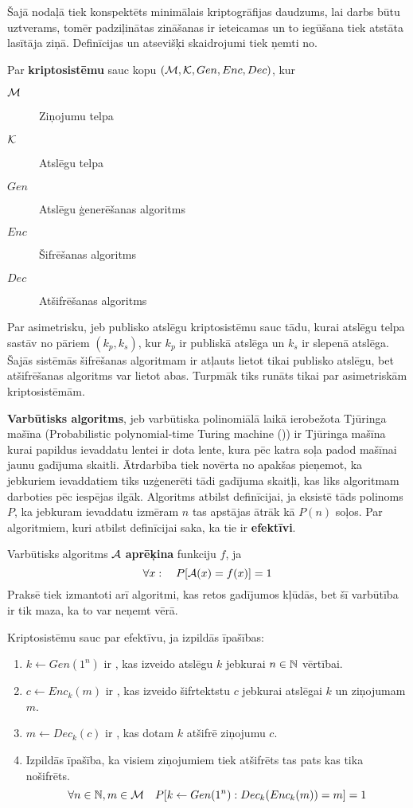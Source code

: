 Šajā nodaļā tiek konspektēts minimālais kriptogrāfijas daudzums, lai darbs būtu uztverams, tomēr padziļinātas zināšanas ir ieteicamas un to iegūšana tiek atstāta lasītāja ziņā. Definīcijas un atsevišķi skaidrojumi tiek ņemti no\cite{pass10}.

Par \textbf{kriptosistēmu} sauc kopu $(\mathcal{M}, \mathcal{K}, Gen, Enc, Dec)$, kur
\begin{description}
    \item[$\mathcal{M}$]Ziņojumu telpa
    \item[$\mathcal{K}$]Atslēgu telpa
    \item[$Gen$]Atslēgu ģenerēšanas algoritms
    \item[$Enc$]Šifrēšanas algoritms
    \item[$Dec$]Atšifrēšanas algoritms
\end{description}

Par asimetrisku, jeb publisko atslēgu kriptosistēmu sauc tādu, kurai atslēgu telpa sastāv no pāriem $(k_p, k_s)$, kur $k_p$ ir publiskā atslēga un $k_s$ ir slepenā atslēga. Šajās sistēmās šifrēšanas algoritmam ir atļauts lietot tikai publisko atslēgu, bet atšifrēšanas algoritms var lietot abas. Turpmāk tiks runāts tikai par asimetriskām kriptosistēmām.

\textbf{Varbūtisks algoritms}, jeb varbūtiska polinomiālā laikā ierobežota Tjūringa mašīna (Probabilistic polynomial-time Turing machine (\ppt)) ir Tjūringa mašīna kurai papildus ievaddatu lentei ir dota lente, kura pēc katra soļa padod mašīnai jaunu gadījuma skaitli. Ātrdarbība tiek novērta no apakšas pieņemot, ka jebkuriem ievaddatiem tiks uzģenerēti tādi gadījuma skaitļi, kas liks algoritmam darboties pēc iespējas ilgāk. Algoritms atbilst definīcijai, ja eksistē tāds polinoms $P$, ka jebkuram ievaddatu izmēram $n$ tas apstājas ātrāk kā $P(n)$ soļos. Par algoritmiem, kuri atbilst definīcijai saka, ka tie ir \textbf{efektīvi}.

Varbūtisks algoritms $\mathcal{A}$ \textbf{aprēķina} funkciju $f$, ja
$$ \forall x : \quad P[\mathcal{A}(x) = f(x)] = 1 $$
Praksē tiek izmantoti arī algoritmi, kas retos gadījumos kļūdās, bet šī varbūtība ir tik maza, ka to var neņemt vērā.

Kriptosistēmu sauc par efektīvu, ja izpildās īpašības:
\begin{enumerate}
    \item $k \leftarrow Gen(1^n)$ ir \ppt, kas izveido atslēgu $k$ jebkurai $n\in\mathbb{N}$ vērtībai.
    \item $c \leftarrow Enc_k(m)$ ir \ppt, kas izveido šifrtektstu $c$ jebkurai atslēgai $k$ un ziņojumam $m$.
    \item $m \leftarrow Dec_k(c)$ ir \ppt, kas dotam $k$ atšifrē ziņojumu $c$.
    \item Izpildās īpašība, ka visiem ziņojumiem tiek atšifrēts tas pats kas tika nošifrēts.
        $$ \forall n\in\mathbb{N}, m\in\mathcal{M} \quad P[k\leftarrow Gen(1^n): Dec_k(Enc_k(m)) = m] = 1 $$
\end{enumerate}

